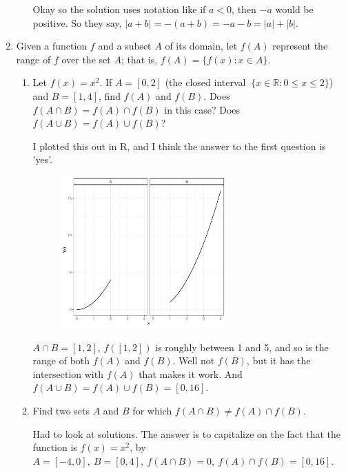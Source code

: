 \documentclass{article}
\numberwithin{equation}{subsection}
\numberwithin{theo}{subsection}
\begin{document}
\begin{enumerate}
\begin{enumerate}
                Okay so the solution uses notation like if $a < 0$, then $-a$
                would be positive. So they say, $\lvert a + b \rvert = -(a + b)
                = -a-b = \lvert a \rvert + \lvert b \rvert$.

        \end{enumerate}

    \item Given a function $f$ and a subset $A$ of its domain, let $f(A)$ represent the
        range of $f$ over the set $A$; that is, $f(A) = \{f(x) : x \in A\}$.

        \begin{enumerate}
            \item Let $f(x) = x^2$. If $A = [0, 2]$ (the closed interval $~\{x
                \in \mathbb{R} : 0 \leq x \leq 2 \}$) and $B = [1, 4]$, find
                $f(A)$ and $f(B)$. Does $f(A \cap B) = f(A) \cap f(B)$ in this
                case? Does $f(A \cup B) = f(A) \cup f(B)$? 

            I plotted this out in R, and I think the answer to the first
            question is 'yes'. 

            \begin{figure}[ht!]
                \centering
                \includegraphics[width=2.5in, scale=0.5]{exercise1-2-7.pdf}
            \end{figure}

            $A \cap B = [1,2]$, $f([1,2])$ is roughly between 1 and 5, and so
           is the range of both $f(A)$ and $f(B)$. Well not $f(B)$, but it has
           the intersection with $f(A)$ that makes it work. And $f(A \cup B) =
           f(A) \cup f(B) = [0, 16]$.

       \item Find two sets $A$ and $B$ for which $f(A \cap B) \neq f(A) \cap
           f(B)$.

           Had to look at solutions. The answer is to capitalize on the fact
           that the function is $f(x) = x^2$, by $A = [-4, 0],~B = [0,
           4],~f(A\cap B) = {0},~f(A) \cap f(B) = [0, 16]$.

        \end{enumerate}


\end{enumerate}
\end{document}
